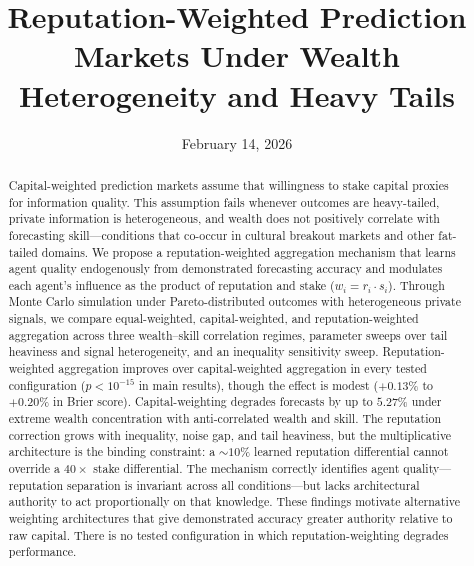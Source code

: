 \documentclass[conference]{IEEEtran}
\begin{document}
\title{Reputation-Weighted Prediction Markets Under Wealth Heterogeneity and Heavy Tails}

\author{
}

\date{February 14, 2026}

\maketitle

\begin{abstract}
Capital-weighted prediction markets assume that willingness to stake capital proxies for information quality. This assumption fails whenever outcomes are heavy-tailed, private information is heterogeneous, and wealth does not positively correlate with forecasting skill---conditions that co-occur in cultural breakout markets and other fat-tailed domains. We propose a reputation-weighted aggregation mechanism that learns agent quality endogenously from demonstrated forecasting accuracy and modulates each agent's influence as the product of reputation and stake ($w_i = r_i \cdot s_i$). Through Monte Carlo simulation under Pareto-distributed outcomes with heterogeneous private signals, we compare equal-weighted, capital-weighted, and reputation-weighted aggregation across three wealth--skill correlation regimes, parameter sweeps over tail heaviness and signal heterogeneity, and an inequality sensitivity sweep. Reputation-weighted aggregation improves over capital-weighted aggregation in every tested configuration ($p < 10^{-15}$ in main results), though the effect is modest ($+0.13\%$ to $+0.20\%$ in Brier score). Capital-weighting degrades forecasts by up to $5.27\%$ under extreme wealth concentration with anti-correlated wealth and skill. The reputation correction grows with inequality, noise gap, and tail heaviness, but the multiplicative architecture is the binding constraint: a ${\sim}10\%$ learned reputation differential cannot override a $40\times$ stake differential. The mechanism correctly identifies agent quality---reputation separation is invariant across all conditions---but lacks architectural authority to act proportionally on that knowledge. These findings motivate alternative weighting architectures that give demonstrated accuracy greater authority relative to raw capital. There is no tested configuration in which reputation-weighting degrades performance.
\end{abstract}
\end{document}
